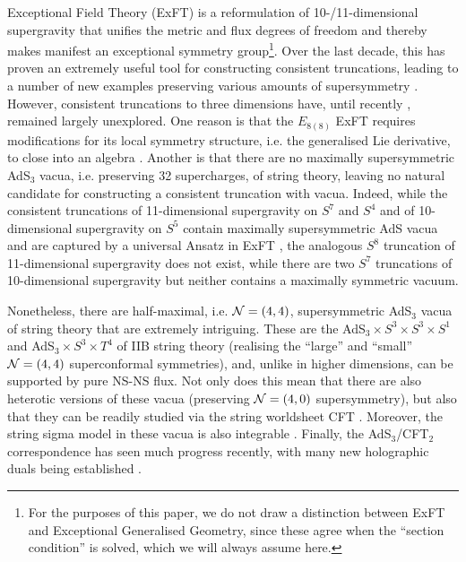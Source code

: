 \documentclass[a4paper, 11pt]{article}
\numberwithin{equation}{section}
\newcommand{\EE}{\ensuremath{E_{8(8)}}\xspace}
\newcommand{\+}{\oplus}
\begin{document}
Exceptional Field Theory (ExFT) is a reformulation of 10-/11-dimensional supergravity that unifies the metric and flux degrees of freedom and thereby makes manifest an exceptional symmetry group\footnote{For the purposes of this paper, we do not draw a distinction between ExFT and Exceptional Generalised Geometry, since these agree when the ``section condition'' is solved, which we will always assume here.}. Over the last decade, this has proven an extremely useful tool for constructing consistent truncations, leading to a number of new examples preserving various amounts of supersymmetry \cite{Hohm:2014qga,Lee:2014mla,Malek:2015hma,Baguet:2015sma,Baguet:2015iou,Lee:2015xga,Malek:2016bpu,Ciceri:2016dmd,Cassani:2016ncu,Inverso:2016eet,Malek:2017cle,Malek:2017njj,Malek:2018zcz,Malek:2019ucd,Cassani:2019vcl,Malek:2020jsa,Cassani:2020cod}. However, consistent truncations to three dimensions have, until recently \cite{Galli:2022idq}, remained largely unexplored. One reason is that the $\EE$ ExFT requires modifications for its local symmetry structure, i.e. the generalised Lie derivative, to close into an algebra \cite{Hohm:2014fxa,Cederwall:2015ica}. Another is that there are no maximally supersymmetric AdS$_3$ vacua, i.e. preserving 32 supercharges, of string theory, leaving no natural candidate for constructing a consistent truncation with vacua. Indeed, while the consistent truncations of 11-dimensional supergravity on $S^7$ and $S^4$ and of 10-dimensional supergravity on $S^5$ contain maximally supersymmetric AdS vacua and are captured by a universal Ansatz in ExFT \cite{Hohm:2014qga,Lee:2014mla}, the analogous $S^8$ truncation of 11-dimensional supergravity does not exist, while there are two $S^7$ truncations of 10-dimensional supergravity but neither contains a maximally symmetric vacuum\cite{Fischbacher:2003yw,Galli:2022idq}.

Nonetheless, there are half-maximal, i.e. ${\cal N}=(4,4)$, supersymmetric AdS$_3$ vacua of string theory that are extremely intriguing. These are the AdS$_3 \times S^3 \times S^3 \times S^1$ and AdS$_3 \times S^3 \times T^4$ of IIB string theory (realising the ``large'' and ``small'' ${\cal N}=(4,4)$ superconformal symmetries), and, unlike in higher dimensions, can be supported by pure NS-NS flux. Not only does this mean that there are also heterotic versions of these vacua (preserving ${\cal N}=(4,0)$ supersymmetry), but also that they can be readily studied via the string worldsheet CFT \cite{Maldacena:2000hw,Eberhardt:2018ouy,Eberhardt:2019niq,Eberhardt:2019ywk}. Moreover, the string sigma model in these vacua is also integrable \cite{}. Finally, the AdS$_3$/CFT$_2$ correspondence has seen much progress recently, with many new holographic duals being established \cite{}.
\end{document}
